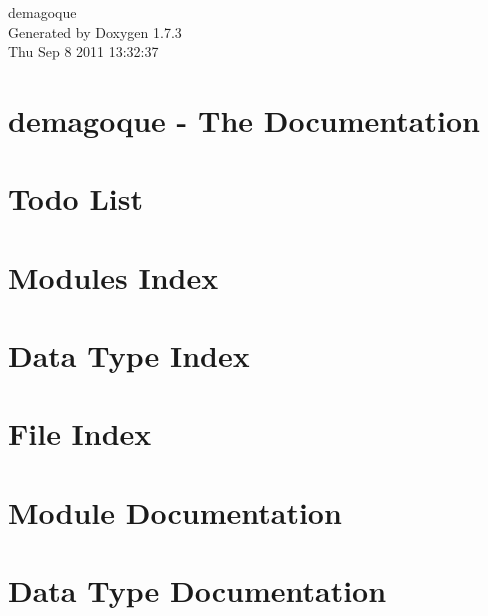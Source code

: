 \documentclass[a4paper]{book}
\begin{document}
\hypersetup{pageanchor=false}
\begin{titlepage}
\vspace*{7cm}
\begin{center}
{\Large demagoque }\\
\vspace*{1cm}
{\large Generated by Doxygen 1.7.3}\\
\vspace*{0.5cm}
{\small Thu Sep 8 2011 13:32:37}\\
\end{center}
\end{titlepage}
\clearemptydoublepage
{}
\tableofcontents
\clearemptydoublepage
{}
\hypersetup{pageanchor=true}
\chapter{demagoque -\/ The Documentation}
\label{index}\hypertarget{index}{}
\chapter{Todo List}
\label{todo}
\hypertarget{todo}{}

\chapter{Modules Index}

\chapter{Data Type Index}

\chapter{File Index}

\chapter{Module Documentation}

















\chapter{Data Type Documentation}



\end{document}
